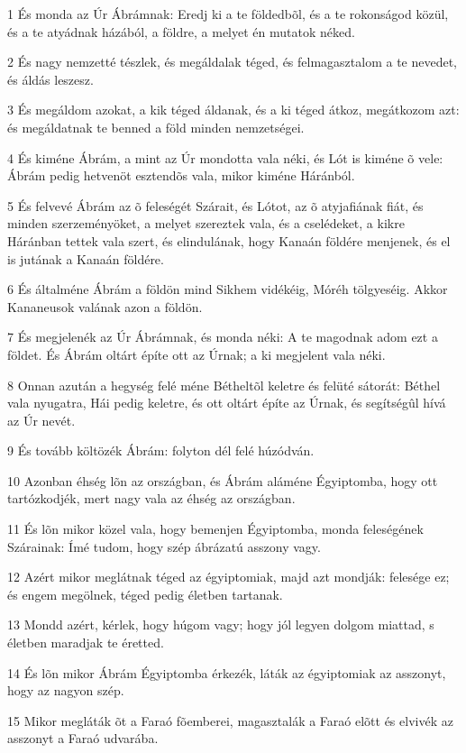\par 1 És monda az Úr Ábrámnak: Eredj ki a te földedbõl, és a te rokonságod közül, és a te atyádnak házából, a földre, a melyet én mutatok néked.
\par 2 És nagy nemzetté tészlek, és megáldalak téged, és felmagasztalom a te nevedet, és áldás leszesz.
\par 3 És megáldom azokat, a kik téged áldanak, és a ki téged átkoz, megátkozom azt: és megáldatnak te benned a föld minden nemzetségei.
\par 4 És kiméne Ábrám, a mint az Úr mondotta vala néki, és Lót is kiméne õ vele: Ábrám pedig hetvenöt esztendõs vala, mikor kiméne Háránból.
\par 5 És felvevé Ábrám az õ feleségét Szárait, és Lótot, az õ atyjafiának fiát, és minden szerzeményöket, a melyet szereztek vala, és a cselédeket, a kikre Háránban tettek vala szert, és elindulának, hogy Kanaán földére menjenek, és el is jutának a Kanaán földére.
\par 6 És általméne Ábrám a földön mind Sikhem vidékéig, Móréh tölgyeséig. Akkor Kananeusok valának azon a földön.
\par 7 És megjelenék az Úr Ábrámnak, és monda néki: A te magodnak adom ezt a földet. És Ábrám oltárt építe ott az Úrnak; a ki megjelent vala néki.
\par 8 Onnan azután a hegység felé méne Bétheltõl keletre és felüté sátorát: Béthel vala nyugatra, Hái pedig keletre, és ott oltárt építe az Úrnak, és segítségûl hívá az Úr nevét.
\par 9 És tovább költözék Ábrám: folyton dél felé húzódván.
\par 10 Azonban éhség lõn az országban, és Ábrám aláméne Égyiptomba, hogy ott tartózkodjék, mert nagy vala az éhség az országban.
\par 11 És lõn mikor közel vala, hogy bemenjen Égyiptomba, monda feleségének Szárainak: Ímé tudom, hogy szép ábrázatú asszony vagy.
\par 12 Azért mikor meglátnak téged az égyiptomiak, majd azt mondják: felesége ez; és engem megölnek, téged pedig életben tartanak.
\par 13 Mondd azért, kérlek, hogy húgom vagy; hogy jól legyen dolgom miattad, s életben maradjak te éretted.
\par 14 És lõn mikor Ábrám Égyiptomba érkezék, láták az égyiptomiak az asszonyt, hogy az nagyon szép.
\par 15 Mikor megláták õt a Faraó fõemberei, magasztalák a Faraó elõtt és elvivék az asszonyt a Faraó udvarába.
